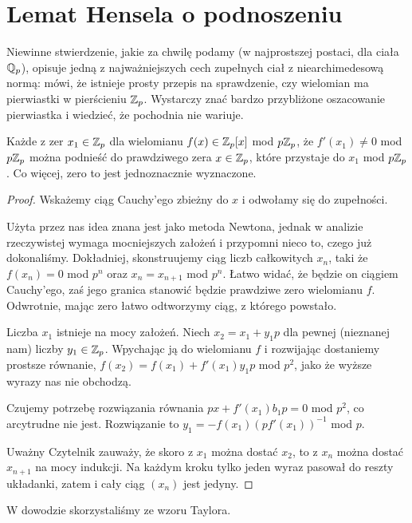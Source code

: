 \section{Lemat Hensela o podnoszeniu}
Niewinne  stwierdzenie, jakie za chwilę podamy (w najprostszej postaci, dla ciała $\mathbb Q_p$), opisuje jedną z najważniejszych cech zupełnych ciał z niearchimedesową normą: mówi, że istnieje prosty przepis na sprawdzenie, czy wielomian ma pierwiastki w pierścieniu $\mathbb Z_p$.
Wystarczy znać bardzo przybliżone oszacowanie pierwiastka i wiedzieć, że pochodnia nie wariuje.

\begin{twierdzenie}
	Każde z zer $x_1 \in \mathbb Z_p$ dla wielomianu $f(x) \in \mathbb Z_p[x]$ mod $p\mathbb Z_p$, że $f'(x_1) \neq 0$ mod $p \mathbb Z_p$ można podnieść do prawdziwego zera $x \in \mathbb Z_p$, które przystaje do $x_1$ mod $p\mathbb Z_p$.
	Co więcej, zero to jest jednoznacznie wyznaczone.
\end{twierdzenie}

\begin{proof}
	Wskażemy ciąg Cauchy'ego zbieżny do $x$ i odwołamy się do zupełności.

	Użyta przez nas idea znana jest jako metoda Newtona, jednak w analizie rzeczywistej wymaga mocniejszych założeń i przypomni nieco to, czego już dokonaliśmy.
	Dokładniej, skonstruujemy ciąg liczb całkowitych $x_n$, taki że $f(x_n) = 0$ mod $p^n$ oraz $x_n = x_{n+1}$ mod $p^n$.
	Łatwo widać, że będzie on ciągiem Cauchy'ego, zaś jego granica stanowić będzie prawdziwe zero wielomianu $f$.
	Odwrotnie, mając zero łatwo odtworzymy ciąg, z którego powstało.

	Liczba $x_1$ istnieje na mocy założeń.
	Niech $x_2 = x_1 + y_1 p$ dla pewnej (nieznanej nam) liczby $y_1 \in \mathbb Z_p$.
	Wpychając ją do wielomianu $f$ i rozwijając dostaniemy prostsze równanie, $f(x_2) = f(x_1) + f'(x_1) y_1 p$ mod $p^2$, jako że wyższe wyrazy nas nie obchodzą.
	
	Czujemy potrzebę rozwiązania równania $px + f'(x_1)b_1p = 0$ mod $p^2$, co arcytrudne nie jest.
	Rozwiązanie to $y_1 = - f(x_1) (p f'(x_1))^{-1}$ mod $p$.
	
	Uważny Czytelnik zauważy, że skoro z $x_1$ można dostać $x_2$, to z $x_n$ można dostać $x_{n+1}$ na mocy indukcji.
	Na każdym kroku tylko jeden wyraz pasował do reszty układanki, zatem i cały ciąg $(x_n)$ jest jedyny.
\end{proof}

W dowodzie skorzystaliśmy ze wzoru Taylora. 

